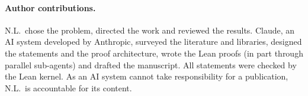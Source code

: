 \documentclass[11pt]{article}
\theoremstyle{definition}
\theoremstyle{remark}
\begin{document}
\paragraph{Author contributions.} N.L.\ chose the problem, directed the work and reviewed the
results. Claude, an AI system developed by Anthropic, surveyed the literature and libraries,
designed the statements and the proof architecture, wrote the Lean proofs (in part through
parallel sub-agents) and drafted the manuscript. All statements were checked by the Lean kernel.
As an AI system cannot take responsibility for a publication, N.L.\ is accountable for its
content.



\end{document}
